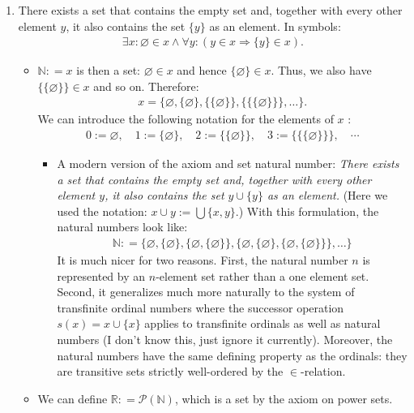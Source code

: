 \documentclass{article}
\begin{document}
\begin{enumerate}
\begin{itemize}
\end{itemize}
\item {} There exists a set that contains the empty set and, together with every other element $y$, it also contains the set $\{y\}$ as an element. In symbols:
\begin{align*}
\exists x: \varnothing \in x \wedge \forall y:(y \in x \Rightarrow\{y\} \in x) .
\end{align*}
\begin{itemize}
    \item  $\mathbb{N:}=x$ is then a set:  $\varnothing \in x$ and hence $\{\varnothing\} \in x$. Thus, we also have $\{\{\varnothing\}\} \in x$ and so on. Therefore:
\begin{align*}
x=\{\varnothing,\{\varnothing\},\{\{\varnothing\}\},\{\{\{\varnothing\}\}\}, \ldots\} .
\end{align*}
We can introduce the following notation for the elements of $x$ :
\begin{align*}
0:=\varnothing, \quad 1:=\{\varnothing\}, \quad 2:=\{\{\varnothing\}\}, \quad 3:=\{\{\{\varnothing\}\}\}, \quad \cdots
\end{align*}
\begin{itemize}[$\ast$]
    \item A modern version of the axiom and set natural number:  \emph{There exists a set that contains the empty set and, together with every other element $y$, it also contains the set $y \cup\{y\}$ as an element.} (Here we used the notation: $x \cup y:=\bigcup\{x, y\}$.)
With this formulation, the natural numbers look like:
\begin{align*}
\mathbb{N:}=\{\varnothing,\{\varnothing\},\{\varnothing,\{\varnothing\}\},\{\varnothing,\{\varnothing\},\{\varnothing,\{\varnothing\}\}\}, \ldots\}
\end{align*}
It is much nicer for two reasons. First, the natural number $n$ is represented by an $n$-element set rather than a one element set. Second, it generalizes much more naturally to the system of transfinite ordinal numbers where the successor operation $s(x)=x \cup\{x\}$ applies to transfinite ordinals as well as natural numbers (I don't know this, just ignore it currently). Moreover, the natural numbers have the same defining property as the ordinals: they are transitive sets strictly well-ordered by the $\in$-relation.
\end{itemize}
\item We can define $\mathbb{R:}=\mathcal{P}(\mathbb{N})$, which is a set by the axiom on power sets.
\end{itemize}


\end{enumerate}
\end{document}
